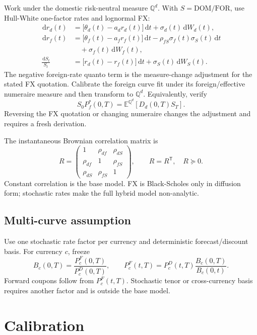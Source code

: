 \documentclass[conference]{IEEEtran}
\newcommand{\Qd}{\mathbb{Q}^{d}}
\newcommand{\E}{\mathbb{E}}
\newcommand{\dd}{\,\mathrm{d}}
\newcommand{\DOM}{\ensuremath{\mathrm{DOM}}}
\newcommand{\FOR}{\ensuremath{\mathrm{FOR}}}
\begin{document}
Work under the domestic risk-neutral measure $\Qd$. With $S=\DOM/\FOR$, use Hull-White one-factor rates and lognormal FX:
\begin{align}
  \dd r_d(t) &= \bigl[\theta_d(t)-a_dr_d(t)\bigr]\dd t+\sigma_d(t)\dd W_d(t), \\
  \dd r_f(t) &= \bigl[\theta_f(t)-a_fr_f(t)\bigr]\dd t
                 -\rho_{fS}\sigma_f(t)\sigma_S(t)\dd t \nonumber\\
              &\quad +\sigma_f(t)\dd W_f(t), \\
  \frac{\dd S_t}{S_t} &= \bigl[r_d(t)-r_f(t)\bigr]\dd t+\sigma_S(t)\dd W_S(t).
\end{align}
The negative foreign-rate quanto term is the measure-change adjustment for the stated FX quotation. Calibrate the foreign curve fit under its foreign/effective numeraire measure and then transform to $\Qd$. Equivalently, verify
\[
  S_0P_f^{*}(0,T)=\E^{\Qd}\!\left[D_d(0,T)S_T\right].
\]
Reversing the FX quotation or changing numeraire changes the adjustment and requires a fresh derivation.

The instantaneous Brownian correlation matrix is
\[
R=
\begin{pmatrix}
1 & \rho_{df} & \rho_{dS}\\
\rho_{df} & 1 & \rho_{fS}\\
\rho_{dS} & \rho_{fS} & 1
\end{pmatrix},
\qquad R=R^{\mathsf T},\quad R\succeq0.
\]
Constant correlation is the base model. FX is Black-Scholes only in diffusion form; stochastic rates make the full hybrid model non-analytic.

\subsection{Multi-curve assumption}

Use one stochastic rate factor per currency and deterministic forecast/discount basis. For currency $c$, freeze
\[
 B_c(0,T)=\frac{P_c^F(0,T)}{P_c^D(0,T)},
 \qquad
 P_c^F(t,T)=P_c^D(t,T)\frac{B_c(0,T)}{B_c(0,t)}.
\]
Forward coupons follow from $P_c^F(t,T)$. Stochastic tenor or cross-currency basis requires another factor and is outside the base model.


\section{Calibration}
\end{document}
